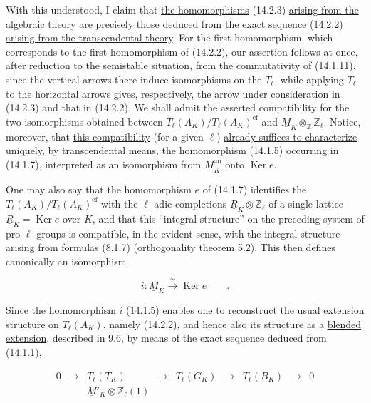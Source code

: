 \noindent
With this understood, I claim that \underline{the homomorphisms}
(14.2.3) \underline{arising from the algebraic theory are precisely
those deduced from the exact sequence} (14.2.2) \underline{arising
from the transcendental theory}.  For the first homomorphism, which
corresponds to the first homomorphism of (14.2.2), our assertion follows
at once, after reduction to the semistable situation, from the
commutativity of (14.1.11), since the vertical arrows there induce
isomorphisms on the $T_\ell$, while applying $T_\ell$ to the horizontal
arrows gives, respectively, the arrow under consideration in (14.2.3)
and that in (14.2.2).  We shall admit the asserted compatibility for
the two isomorphisms obtained between
$T_\ell(A_K)/T_\ell(A_K)^{\mathrm{ef}}$ and
$\underline M_K\otimes_{\mathbb Z}\mathbb Z_\ell$.  Notice, moreover,
that \underline{this compatibility} (for a given $\ell$)
\underline{already suffices to characterize uniquely, by
transcendental means, the homomorphism} (14.1.5) \underline{occurring
in} (14.1.7), interpreted as an isomorphism from
$\underline M_K^{\mathrm{an}}$ onto $\operatorname{Ker}e$.

One may also say that the homomorphism $e$ of (14.1.7) identifies the
$T_\ell(A_K)/T_\ell(A_K)^{\mathrm{ef}}$ with the $\ell$-adic
completions $\underline R_K\otimes\mathbb Z_\ell$ of a single lattice
$\underline R_K=\operatorname{Ker}e$ over $K$, and that this
``integral structure'' on the preceding system of pro-$\ell$ groups is
compatible, in the evident sense, with the integral structure arising
from formulas (8.1.7) (orthogonality theorem 5.2).  This then defines
canonically an isomorphism

\begin{equation*}
 i:\underline M_K\xrightarrow{\ \sim\ }\operatorname{Ker}e
 \qquad .
\end{equation*}

Since the homomorphism $i$ (14.1.5) enables one to reconstruct the
usual extension structure on $T_\ell(A_K)$, namely (14.2.2), and hence
also its structure as a \underline{blended extension}, described in
9.6, by means of the exact sequence deduced from (14.1.1),

\begin{equation*}
\begin{array}{ccccccccc}
0&\longrightarrow&T_\ell(T_K)&\longrightarrow&T_\ell(G_K)
 &\longrightarrow&T_\ell(B_K)&\longrightarrow&0\\[5ex]
 &&\underline M'_K\otimes\mathbb Z_\ell(1)&&&&&&
\end{array}
\end{equation*}

